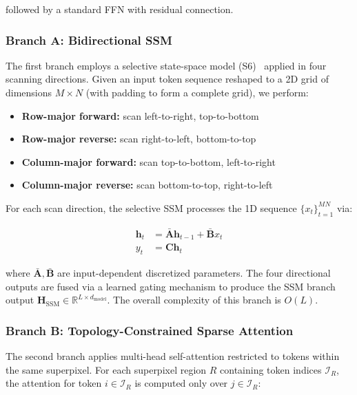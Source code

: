 \documentclass[lettersize,journal]{IEEEtran}
\begin{document}
followed by a standard FFN with residual connection.

\subsubsection{Branch A: Bidirectional SSM}

The first branch employs a selective state-space model (S6)~\cite{ref6} applied in four scanning directions. Given an input token sequence reshaped to a 2D grid of dimensions $M \times N$ (with padding to form a complete grid), we perform:

\begin{itemize}
\item \textbf{Row-major forward:} scan left-to-right, top-to-bottom
\item \textbf{Row-major reverse:} scan right-to-left, bottom-to-top
\item \textbf{Column-major forward:} scan top-to-bottom, left-to-right
\item \textbf{Column-major reverse:} scan bottom-to-top, right-to-left
\end{itemize}

For each scan direction, the selective SSM processes the 1D sequence $\{x_t\}_{t=1}^{MN}$ via:

\begin{equation}
\label{eq:ssm}
\begin{aligned}
\mathbf{h}_t &= \bar{\mathbf{A}} \mathbf{h}_{t-1} + \bar{\mathbf{B}} x_t \\
y_t &= \mathbf{C} \mathbf{h}_t
\end{aligned}
\end{equation}

where $\bar{\mathbf{A}}, \bar{\mathbf{B}}$ are input-dependent discretized parameters. The four directional outputs are fused via a learned gating mechanism to produce the SSM branch output $\mathbf{H}_{\text{SSM}} \in \mathbb{R}^{L \times d_{\text{model}}}$. The overall complexity of this branch is $O(L)$.

\subsubsection{Branch B: Topology-Constrained Sparse Attention}

The second branch applies multi-head self-attention restricted to tokens within the same superpixel. For each superpixel region $R$ containing token indices $\mathcal{I}_R$, the attention for token $i \in \mathcal{I}_R$ is computed only over $j \in \mathcal{I}_R$:
\end{document}
